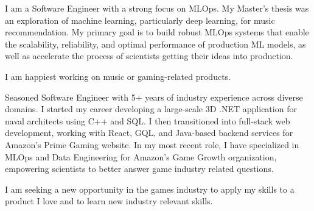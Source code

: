 \documentclass{cv}
\begin{document}
	\makecvheader

	\par{
		I am a Software Engineer with a strong focus on MLOps. My Master's thesis was an exploration of machine learning, particularly deep learning, for music recommendation. My primary goal is to build robust MLOps systems that enable the scalability, reliability, and optimal performance of production ML models, as well as accelerate the process of scientists getting their ideas into production. 
		
		I am happiest working on music or gaming-related products.

		Seasoned Software Engineer with 5+ years of industry experience across diverse domains. I started my career developing a large-scale 3D .NET application for naval architects using C++ and SQL. I then transitioned into full-stack web development, working with React, GQL, and Java-based backend services for Amazon's Prime Gaming website. In my most recent role, I have specialized in MLOps and Data Engineering for Amazon's Game Growth organization, empowering scientists to better answer game industry related questions.
		
		I am seeking a new opportunity in the games industry to apply my skills to a product I love and to learn new industry relevant skills.
	}

	\bigskip
	
\end{document}
